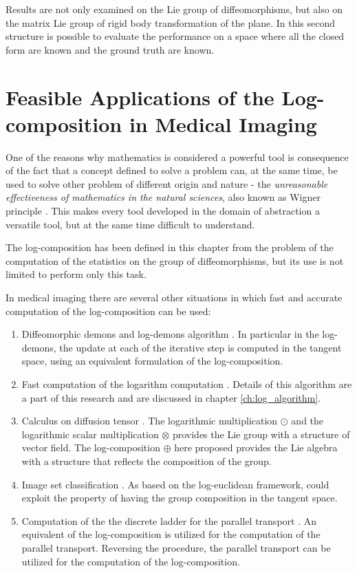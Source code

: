 Results are not only examined on the Lie group of diffeomorphisms, but also on the matrix Lie group of rigid body transformation of the plane. In this second structure is possible to evaluate the performance on a space where all the closed form are known and the ground truth are known.

\section{Feasible Applications of the Log-composition in Medical Imaging}
One of the reasons why mathematics is considered a powerful tool is consequence of the fact that a concept defined to solve a problem can, at the same time, be used to solve other problem of different origin and nature - the \emph{unreasonable effectiveness of mathematics in the natural sciences}, also known as Wigner principle \cite{wigner1960unreasonable}. This makes every tool developed in the domain of abstraction a versatile tool, but at the same time difficult to understand.

The log-composition has been defined in this chapter from the problem of the computation of the statistics on the group of diffeomorphisms, but its use is not limited to perform only this task.

In medical imaging there are several other situations in which fast and accurate computation of the log-composition can be used:
\begin{enumerate}
	\item Diffeomorphic demons \cite{vercauteren2007non} and log-demons algorithm \cite{vercauteren08}. In particular in the log-demons, the update at each of the iterative step is computed in the tangent space, using an equivalent formulation of the log-composition. 
	\item Fast computation of the logarithm computation \cite{Bossa:08}. Details of this algorithm are a part of this research and are discussed in chapter \ref{ch:log_algorithm}.
	\item Calculus on diffusion tensor \cite{Arsigny:MRM:06}. The logarithmic multiplication $\odot$ and the logarithmic scalar multiplication $\otimes$ provides the Lie group with a structure of vector field. The log-composition $\oplus$ here proposed provides the Lie algebra with a structure that reflects the composition of the group.  
	\item Image set classification \cite{huanglog}. As based on the log-euclidean framework, could exploit the property of having the group composition in the tangent space.
	\item Computation of the the discrete ladder for the parallel transport \cite{Lorenzi:discrete_ladders:14}. An equivalent of the log-composition is utilized for the computation of the parallel transport. Reversing the procedure, the parallel transport can be utilized for the computation of the log-composition.
\end{enumerate}	


